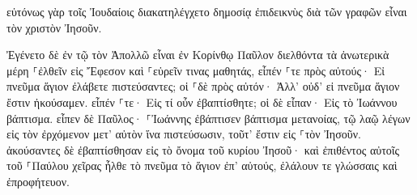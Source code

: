 \documentclass{openreader}
\begin{document}
εὐτόνως γὰρ τοῖς Ἰουδαίοις διακατηλέγχετο δημοσίᾳ ἐπιδεικνὺς διὰ τῶν γραφῶν εἶναι τὸν χριστὸν Ἰησοῦν. 

Ἐγένετο δὲ ἐν τῷ τὸν Ἀπολλῶ εἶναι ἐν Κορίνθῳ Παῦλον διελθόντα τὰ ἀνωτερικὰ μέρη ⸀ἐλθεῖν εἰς Ἔφεσον καὶ ⸀εὑρεῖν τινας μαθητάς, 
εἶπέν ⸀τε πρὸς αὐτούς· Εἰ πνεῦμα ἅγιον ἐλάβετε πιστεύσαντες; οἱ ⸀δὲ πρὸς αὐτόν· Ἀλλ’ οὐδ’ εἰ πνεῦμα ἅγιον ἔστιν ἠκούσαμεν. 
εἶπέν ⸀τε· Εἰς τί οὖν ἐβαπτίσθητε; οἱ δὲ εἶπαν· Εἰς τὸ Ἰωάννου βάπτισμα. 
εἶπεν δὲ Παῦλος· ⸀Ἰωάννης ἐβάπτισεν βάπτισμα μετανοίας, τῷ λαῷ λέγων εἰς τὸν ἐρχόμενον μετ’ αὐτὸν ἵνα πιστεύσωσιν, τοῦτ’ ἔστιν εἰς ⸀τὸν Ἰησοῦν. 
ἀκούσαντες δὲ ἐβαπτίσθησαν εἰς τὸ ὄνομα τοῦ κυρίου Ἰησοῦ· 
καὶ ἐπιθέντος αὐτοῖς τοῦ ⸀Παύλου χεῖρας ἦλθε τὸ πνεῦμα τὸ ἅγιον ἐπ’ αὐτούς, ἐλάλουν τε γλώσσαις καὶ ἐπροφήτευον. 
\end{document}
